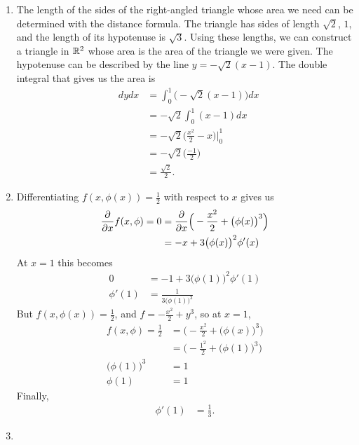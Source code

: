 \documentclass{article}
\begin{document}
\begin{enumerate}
\item %
The length of the sides of the right-angled triangle whose area we need can be determined with the distance formula. The triangle has sides of length $\sqrt{2}$, $1$, and the length of its hypotenuse is $\sqrt{3}$. Using these lengths, we can construct a triangle in $\mathbb{R}^2$ whose area is the area of the triangle we were given. The hypotenuse can be described by the line $y=-\sqrt{2}(x-1)$. The double integral that gives us the area is 
\begin{align*}
  \mathop{\int_0^1 \!\! \int_{0}^{-\sqrt{2}(x-1)}} dydx &= 
  \int_0^1 \Big(-\sqrt{2}(x-1)\Big)dx \\
  &= -\sqrt{2} \int_0^1 (x-1) dx \\
  &= -\sqrt{2} \Big(\frac{x^2}{2}-x\Big)\Big|_0^1 \\
  &= -\sqrt{2}\Big(\frac{-1}{2}\Big) \\
  &= \frac{\sqrt{2}}{2}.
\end{align*}
\item %
Differentiating $f(x,\phi(x))=\frac{1}{2}$ with respect to $x$ gives us 
\begin{align*}
  \frac{\partial}{\partial x} f(x,\phi) = 0 &= \frac{\partial}{\partial x} \Big(-\frac{x^2}{2} + \big(\phi(x)\big)^3\Big)\\
  &= -x + 3\big(\phi(x)\big)^2\phi'(x)
\end{align*}
At $x=1$ this becomes
\begin{align*}
  0 &= -1 + 3\big(\phi(1)\big)^2\phi'(1)\\
  \phi'(1) &=\frac{1}{3\big(\phi(1)\big)^2}
\end{align*}
But $f(x,\phi(x))=\frac{1}{2}$, and $f=-\frac{x^2}{2}+y^3$, so at $x=1$,
\begin{align*}
  f(x,\phi) = \frac{1}{2} 
  &= \Big(-\frac{x^2}{2} + \big(\phi(x)\big)^3\Big)\\
  &= \Big(-\frac{1^2}{2} + \big(\phi(1)\big)^3\Big)\\
  \big(\phi(1)\big)^3 &= 1\\
  \phi(1) &= 1
\end{align*}
Finally,
\begin{align*}
  \phi'(1) &= \frac{1}{3}.
\end{align*}
\item %

\end{enumerate}
\end{document}

